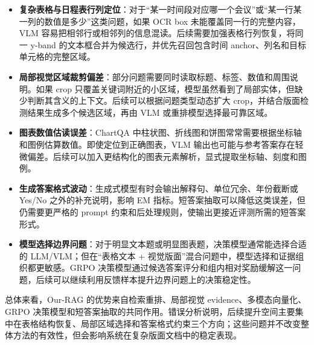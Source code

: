\begin{itemize}
  \item \textbf{复杂表格与日程表行列定位}：对于“某一时间段对应哪一个会议”或“某一行某一列的数值是多少”这类问题，如果 OCR box 未能覆盖同一行的完整内容，VLM 容易把相邻行或相邻列的信息混读。后续需要加强表格行列恢复，将同一 y-band 的文本框合并为候选行，并优先召回包含时间 anchor、列名和目标单元格的完整区域。
  \item \textbf{局部视觉区域裁剪偏差}：部分问题需要同时读取标题、标签、数值和周围说明。如果 crop 只覆盖关键词附近的小区域，模型虽然看到了局部实体，但缺少判断其含义的上下文。后续可以根据问题类型动态扩大 crop，并结合版面检测结果生成多个候选区域，再由 VLM 或重排模型选择最可靠区域。
  \item \textbf{图表数值估读误差}：ChartQA 中柱状图、折线图和饼图常常需要根据坐标轴和图例估算数值。即使定位到正确图表，VLM 输出也可能与参考答案存在轻微偏差。后续可以加入更结构化的图表元素解析，显式提取坐标轴、刻度和图例。
  \item \textbf{生成答案格式波动}：生成式模型有时会输出解释句、单位冗余、年份截断或 Yes/No 之外的补充说明，影响 EM 指标。短答案抽取可以降低这类误差，但仍需要更严格的 prompt 约束和后处理规则，使输出更接近评测所需的短答案形式。
  \item \textbf{模型选择边界问题}：对于明显文本题或明显图表题，决策模型通常能选择合适的 LLM/VLM；但在“表格文本 + 视觉版面”混合问题中，模型选择和证据组织都更敏感。GRPO 决策模型通过候选答案评分和组内相对奖励缓解这一问题，后续可以继续利用反馈样本提升边界问题上的决策稳定性。
\end{itemize}

总体来看，Our-RAG 的优势来自检索重排、局部视觉 evidence、多模态向量化、GRPO 决策模型和短答案抽取的共同作用。错误分析说明，后续提升空间主要集中在表格结构恢复、局部区域选择和答案格式约束三个方向；这些问题并不改变整体方法的有效性，但会影响系统在复杂版面文档中的稳定表现。
